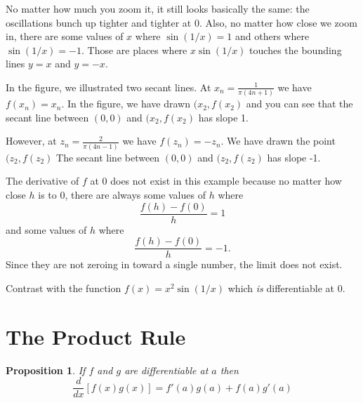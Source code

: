 \documentclass[11pt]{book}
\newtheorem{prop}{Proposition}
\numberwithin{example}{chapter}
\begin{document}
No matter how much you zoom it, it still looks basically the same: the oscillations bunch up tighter and tighter at 0.  Also, no matter how close we zoom in, there are some values of $x$ where $\sin(1/x)=1$ and others where $\sin(1/x)=-1$.  Those are places where $x\sin(1/x)$ touches the bounding lines $y=x$ and $y=-x$.

In the figure, we illustrated two secant lines.  At $x_n=\frac{1}{\pi(4n+1)}$ we have $f(x_n)=x_n$.  In the figure, we have drawn $(x_2,f(x_2)$ and you can see that the secant line between $(0,0)$ and $(x_2,f(x_2)$ has slope 1.  

However, at $z_n=\frac{2}{\pi(4n-1)}$ we have $f(z_n)=-z_n$.  We have drawn the point $(z_2,f(z_2)$  The secant line between $(0,0)$ and $(z_2,f(z_2)$ has slope -1.  

The derivative of $f$ at 0 does not exist in this example because no matter how close $h$ is to 0, there are always some values of $h$ where 
$$\frac{f(h)-f(0)}{h}=1$$
and some values of $h$ where 
$$\frac{f(h)-f(0)}{h}=-1.$$
Since they are not zeroing in toward a single number, the limit does not exist.  

Contrast with the function $f(x)=x^2\sin(1/x)$ which \emph{is} differentiable at 0.  

\section{The Product Rule}

\begin{prop}
If $f$ and $g$ are differentiable at $a$ then 
$$\frac{d}{dx}[f(x)g(x)]=f'(a)g(a)+f(a)g'(a)$$

\end{prop}
\end{document}
